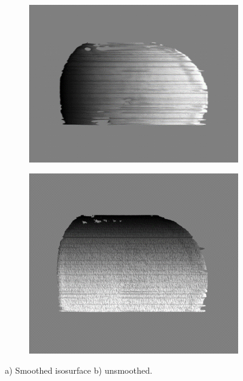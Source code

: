 \begin{figure}[h]
	\hspace*{0.5cm}
	\begin{subfigure}[b]{0.48\textwidth}
		\centering
		\includegraphics[width=1\linewidth]{Figs/Ch4/may2}
		\caption{}
		
	\end{subfigure}%
	\hspace*{0.5cm}
	\begin{subfigure}[b]{0.48\textwidth}
		\centering
		\includegraphics[width=1\linewidth]{Figs/Ch4/may1}
		\caption{}
	\end{subfigure}%
	
	\caption{a) Smoothed isosurface b) unsmoothed.}
	\label{smoothmayavi}
\end{figure}
\FloatBarrier
 
